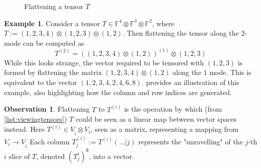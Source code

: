 \documentclass[12pt,a4paper,oneside]{book}
\def\field{\mathbb{F}} %
\theoremstyle{definition}
\newtheorem{example}{Example}
\newtheorem*{observation}{Observation}
\begin{document}
\begin{figure}[h]
    \caption{Flattening a tensor  $T$}\label{figure:flatteningtensor}
\end{figure}
\begin{example}
    Consider a tensor $T \in \field^4\otimes\field^3\otimes\field^2$, where $T := (1,2,3,4) \otimes (1,2,3) \otimes (1,2)$. Then flattening the tensor along the $2$-mode can be computed as 
    $$T^{(2)} = ((1,2,3,4) \otimes (1,2))^{(1)} \otimes (1, 2, 3)$$
    While this looks strange, the vector required to be tensored with $(1,2,3)$ is formed by flattening the matrix $(1,2,3,4) \otimes (1,2)$ along the $1$ mode. This is equivalent to the vector $(1,2,3,4,2,4,6,8)$.  provides an illustration of this example, also highlighting how the column and row indices are generated.
\end{example}
\begin{observation}
    Flattening $T$ to $T^{(i)}$ is the operation by which (from \cref{list:viewingtensors}) $T$ could be seen as a linear map between vector spaces instead. Here $T^{(i)} \in V_{\hat{i}} \otimes V_i $, seen as a matrix, representing a mapping from $V_i \to V_{\hat{i}}$ Each column $T^{(i)}_j := T^{(i)}(\ldots | j)$ represents the "unravelling" of the $j$-th $i$ slice of $T$, denoted $(T_j^i)^{\emptyset}$, into a vector.
\end{observation}
\end{document}
